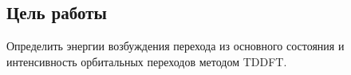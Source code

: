 \subsection{Цель работы}
Определить энергии возбуждения перехода из основного состояния и интенсивность орбитальных переходов методом TDDFT.
